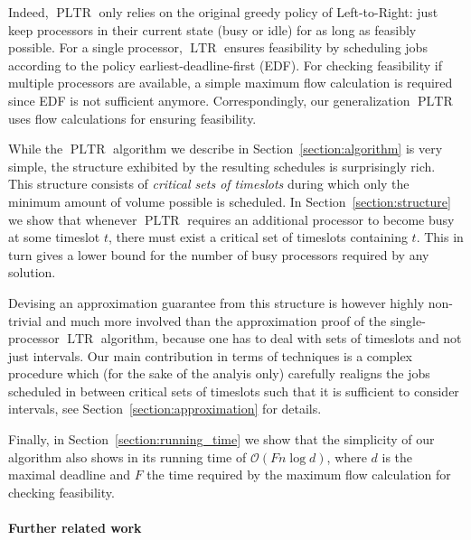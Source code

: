 \documentclass[a4paper]{article}
\DeclareMathOperator{\PLTR}{PLTR}
\DeclareMathOperator{\LTR}{LTR}
\begin{document}
Indeed, $\PLTR$ only relies on the original greedy policy of Left-to-Right: just keep processors in their current state (busy or idle) for as long as feasibly possible.
For a single processor, $\LTR$ ensures feasibility by scheduling jobs according to the policy earliest-deadline-first (EDF).
For checking feasibility if multiple processors are available, a simple maximum flow calculation is required since EDF is not sufficient anymore.
Correspondingly, our generalization $\PLTR$ uses flow calculations for ensuring feasibility.

While the $\PLTR$ algorithm we describe in Section~\ref{section:algorithm} is very simple, the structure exhibited by the resulting schedules is surprisingly rich.
This structure consists of \textit{critical sets of timeslots} during which only the minimum amount of volume possible is scheduled.
In Section~\ref{section:structure} we show that whenever $\PLTR$ requires an additional processor to become busy at some timeslot $t$, there must exist a critical set of timeslots containing $t$.
This in turn gives a lower bound for the number of busy processors required by any solution.

Devising an approximation guarantee from this structure is however highly non-trivial and much more involved than the approximation proof of the single-processor $\LTR$ algorithm, because one has to deal with sets of timeslots and not just intervals.
Our main contribution in terms of techniques is a complex procedure which (for the sake of the analyis only) carefully realigns the jobs scheduled in between critical sets of timeslots such that it is sufficient to consider intervals, see Section~\ref{section:approximation} for details.

Finally, in Section~\ref{section:running_time} we show that the simplicity of our algorithm also shows in its running time of $\mathcal{O}(F n \log d)$, where $d$ is the maximal deadline and $F$ the time required by the maximum flow calculation for checking feasibility.

\paragraph{Further related work}
\end{document}
